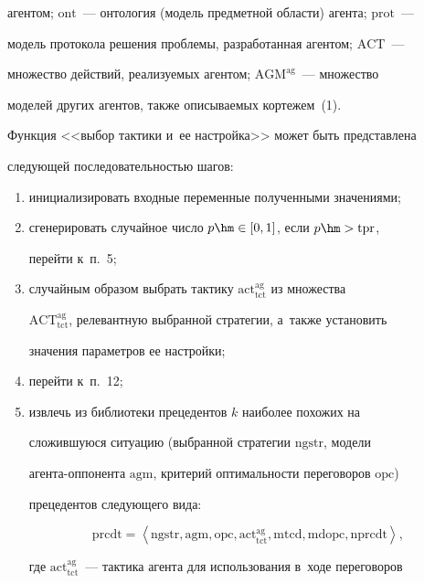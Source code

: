 агентом; $\mathrm{ont}$~--- онтология (модель предметной об\-ласти) агента; $\mathrm{prot}$~--- 


модель протокола решения проб\-ле\-мы, разработанная агентом; $\mathrm{ACT}$~--- 


множество действий, реа\-ли\-зу\-емых агентом; $\mathrm{AGM}^{\mathrm{ag}}$~--- множество 


моделей других агентов, так\-же опи\-сы\-ва\-емых кортежем~(1). 





  Функция <<выбор тактики и~ее настройка>> может быть представлена 


сле\-ду\-ющей последовательностью шагов:


  \begin{enumerate}[(1)]


  \item  инициализировать входные переменные полученными значениями;


  \item сгенерировать случайное число $p\hm\in [0,1]$, если $p\hm> \mathrm{tpr}$, 


перейти к~п.~5;


  \item случайным образом выбрать тактику $\mathrm{act}_{\mathrm{tct}}^{\mathrm{ag}}$ из множества 


$\mathrm{ACT}^{\mathrm{ag}}_{\mathrm{tct}}$, релевантную выбранной стратегии, а~также установить 


значения параметров ее настройки;


  \item перейти к~п.~12;


  \item извлечь из библиотеки прецедентов $k$ наиболее похожих на 


сложившуюся ситуацию (выбранной стратегии $\mathrm{ngstr}$, модели  


аген\-та-оп\-по\-нен\-та $\mathrm{agm}$, критерий оптимальности переговоров $\mathrm{opc}$) 


прецедентов следующего вида:


  $$


  \mathrm{prcdt}=\left\langle \mathrm{ngstr, agm, opc, act}_{\mathrm{tct}}^{\mathrm{ag}}, \mathrm{mtcd, mdopc, 


nprcdt}\right\rangle,


  $$


где $\mathrm{act_{tct}^{ag}}$~--- тактика агента для использования в~ходе переговоров 



\end{enumerate}
